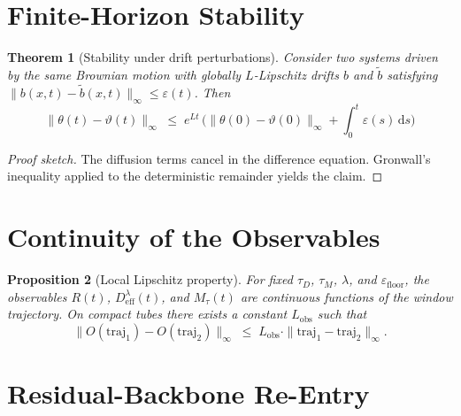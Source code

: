\documentclass[11pt,a4paper]{article}
\theoremstyle{plain}
\newtheorem{theorem}{Theorem}[section]
\newtheorem{proposition}[theorem]{Proposition}
\theoremstyle{definition}
\theoremstyle{remark}
\newcommand{\Deff}{D_{\mathrm{eff}}}
\newcommand{\Mtau}{M_{\tau}}
\newcommand{\Lobs}{L_{\mathrm{obs}}}
\begin{document}
\section{Finite-Horizon Stability}

\begin{theorem}[Stability under drift perturbations]
\label{satz:stabilitaet}
Consider two systems driven by the same Brownian motion with globally $L$-Lipschitz drifts $b$ and $\tilde{b}$ satisfying $\|b(x,t) - \tilde{b}(x,t)\|_{\infty} \leq \varepsilon(t)$. Then
\begin{equation}
\label{eq:gronwall}
\|\theta(t) - \vartheta(t)\|_{\infty}
\;\leq\; e^{Lt}\,\biggl(\|\theta(0) - \vartheta(0)\|_{\infty} + \int_0^t \varepsilon(s)\,\mathrm{d}s\biggr)
\end{equation}
\end{theorem}

\begin{proof}[Proof sketch]
The diffusion terms cancel in the difference equation. Gronwall's inequality applied to the deterministic remainder yields the claim.
\end{proof}

\section{Continuity of the Observables}

\begin{proposition}[Local Lipschitz property]
\label{prop:stetigkeit}
For fixed $\tau_D$, $\tau_M$, $\lambda$, and $\varepsilon_{\mathrm{floor}}$, the observables $R(t)$, $\Deff^{\lambda}(t)$, and $\Mtau(t)$ are continuous functions of the window trajectory. On compact tubes there exists a constant $\Lobs$ such that
\begin{equation}
\label{eq:Lobs}
\|O(\mathrm{traj}_1) - O(\mathrm{traj}_2)\|_{\infty} \;\leq\; \Lobs \cdot \|\mathrm{traj}_1 - \mathrm{traj}_2\|_{\infty}.
\end{equation}
\end{proposition}

\section{Residual-Backbone Re-Entry}
\end{document}
